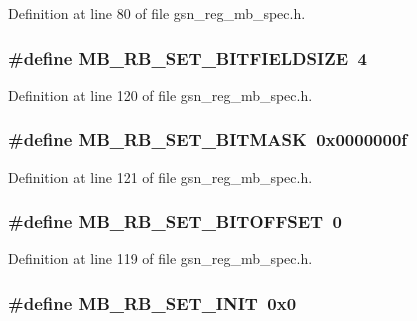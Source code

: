 Definition at line 80 of file gsn\_\-reg\_\-mb\_\-spec.h.

\hypertarget{a00562_a0c0a7c34741e7f79538e238a1dd80a6f}{
\subsubsection[{MB\_\-RB\_\-SET\_\-BITFIELDSIZE}]{\setlength{\rightskip}{0pt plus 5cm}\#define MB\_\-RB\_\-SET\_\-BITFIELDSIZE~4}}
\label{a00562_a0c0a7c34741e7f79538e238a1dd80a6f}


Definition at line 120 of file gsn\_\-reg\_\-mb\_\-spec.h.

\hypertarget{a00562_a8c365378b81896ee394979a116c94207}{
\subsubsection[{MB\_\-RB\_\-SET\_\-BITMASK}]{\setlength{\rightskip}{0pt plus 5cm}\#define MB\_\-RB\_\-SET\_\-BITMASK~0x0000000f}}
\label{a00562_a8c365378b81896ee394979a116c94207}


Definition at line 121 of file gsn\_\-reg\_\-mb\_\-spec.h.

\hypertarget{a00562_a8a50e0d90736b9df9a3f4912d205fed0}{
\subsubsection[{MB\_\-RB\_\-SET\_\-BITOFFSET}]{\setlength{\rightskip}{0pt plus 5cm}\#define MB\_\-RB\_\-SET\_\-BITOFFSET~0}}
\label{a00562_a8a50e0d90736b9df9a3f4912d205fed0}


Definition at line 119 of file gsn\_\-reg\_\-mb\_\-spec.h.

\hypertarget{a00562_affee8a6a909b5aa0a4392f90fb94efe5}{
\subsubsection[{MB\_\-RB\_\-SET\_\-INIT}]{\setlength{\rightskip}{0pt plus 5cm}\#define MB\_\-RB\_\-SET\_\-INIT~0x0}}
\label{a00562_affee8a6a909b5aa0a4392f90fb94efe5}


